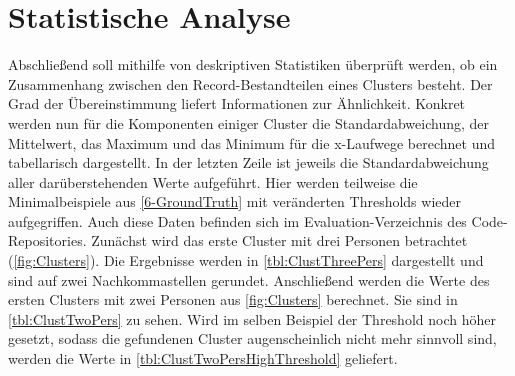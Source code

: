 \section{Statistische Analyse}
\label{6-Statistical}
Abschließend soll mithilfe von deskriptiven Statistiken überprüft werden,
ob ein Zusammenhang zwischen den Record-Bestandteilen eines Clusters besteht.
Der Grad der Übereinstimmung liefert Informationen zur Ähnlichkeit.
Konkret werden nun für die Komponenten einiger Cluster
die Standardabweichung, der Mittelwert, das Maximum und das Minimum für die x-Laufwege berechnet
und tabellarisch dargestellt.
In der letzten Zeile ist jeweils die Standardabweichung aller darüberstehenden Werte aufgeführt.
Hier werden teilweise die Minimalbeispiele aus \autoref{6-GroundTruth} mit veränderten Thresholds wieder aufgegriffen.
Auch diese Daten befinden sich im Evaluation-Verzeichnis des Code-Repositories.
Zunächst wird das erste Cluster mit drei Personen betrachtet (\autoref{fig:Clusters}).
Die Ergebnisse werden in \autoref{tbl:ClustThreePers} dargestellt
und sind auf zwei Nachkommastellen gerundet.
Anschließend werden die Werte des ersten Clusters mit zwei Personen aus \autoref{fig:Clusters} berechnet.
Sie sind in \autoref{tbl:ClustTwoPers} zu sehen.
Wird im selben Beispiel der Threshold noch höher gesetzt,
sodass die gefundenen Cluster augenscheinlich nicht mehr sinnvoll sind,
werden die Werte in \autoref{tbl:ClustTwoPersHighThreshold} geliefert.
